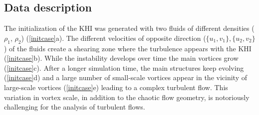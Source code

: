 \subsection{Data description}
The initialization of the KHI was generated with two fluids of different 
densities ($\rho_{1}$, $\rho_{2}$) (\autoref{initcase}a). The
different velocities of opposite direction ($\{u _{1},v_{1}\},\{u _{2},v_{2}\}$) 
of the fluids create a shearing zone where the turbulence appears with the KHI 
(\autoref{initcase}b). While the instability develops over time the main 
vortices grow (\autoref{initcase}c). After a longer simulation time, the main 
structures keep evolving (\autoref{initcase}d) and a large number of 
small-scale vortices appear in the vicinity of large-scale vortices
(\autoref{initcase}e) 
leading to a complex turbulent flow. This variation in vortex scale,
in addition to the chaotic flow geometry,
is notoriously
challenging for the analysis of turbulent flows.

\begin{table}
\centering
{}

\caption{Parameter space of the HYPERION simulation code leading to a total of 180 members for the ensemble dataset used in this study.}
\vspace{-3ex}
\label{tab_parameters}
\end{table}

